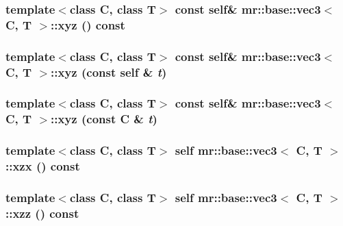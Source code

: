 \subsubsection{\setlength{\rightskip}{0pt plus 5cm}template$<$class C, class T$>$ const {\bf self}\& {\bf mr::base::vec3}$<$ C, T $>$::xyz () const\hspace{0.3cm}{\tt  [inline]}}\label{structmr_1_1base_1_1vec3_z44_2}


\subsubsection{\setlength{\rightskip}{0pt plus 5cm}template$<$class C, class T$>$ const {\bf self}\& {\bf mr::base::vec3}$<$ C, T $>$::xyz (const {\bf self} \& {\em t})\hspace{0.3cm}{\tt  [inline]}}\label{structmr_1_1base_1_1vec3_z44_1}


\subsubsection{\setlength{\rightskip}{0pt plus 5cm}template$<$class C, class T$>$ const {\bf self}\& {\bf mr::base::vec3}$<$ C, T $>$::xyz (const C \& {\em t})\hspace{0.3cm}{\tt  [inline]}}\label{structmr_1_1base_1_1vec3_z44_0}


\subsubsection{\setlength{\rightskip}{0pt plus 5cm}template$<$class C, class T$>$ {\bf self} {\bf mr::base::vec3}$<$ C, T $>$::xzx () const\hspace{0.3cm}{\tt  [inline]}}\label{structmr_1_1base_1_1vec3_z44_14}


\subsubsection{\setlength{\rightskip}{0pt plus 5cm}template$<$class C, class T$>$ {\bf self} {\bf mr::base::vec3}$<$ C, T $>$::xzz () const\hspace{0.3cm}{\tt  [inline]}}\label{structmr_1_1base_1_1vec3_z44_24}


